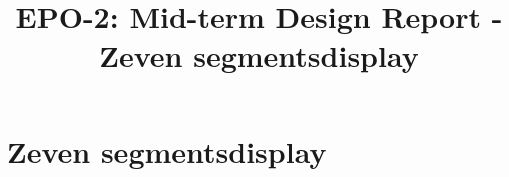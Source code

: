 \documentclass{report}
\title{EPO-2: Mid-term Design Report - Zeven segmentsdisplay}
\author{}
\begin{document}
\chapter{Zeven segmentsdisplay}
\label{ch:sseg}
\end{document}
